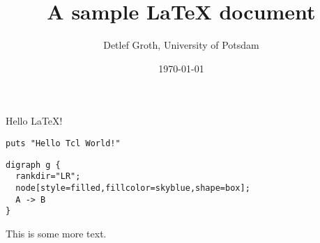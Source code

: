 \documentclass{article}
\title{A sample LaTeX document}
\author{Detlef Groth, University of Potsdam}
\date{\today}
\begin{document}
\maketitle

Hello LaTeX!

\begin{Verbatim}[filter=tcl,label=test,echo=true,eval=true]
puts "Hello Tcl World!"
\end{Verbatim}

\begin{Verbatim}[filter=dot,eval=true]
digraph g {
  rankdir="LR";
  node[style=filled,fillcolor=skyblue,shape=box];
  A -> B
}
\end{Verbatim}

This is some more text.
\end{document}
